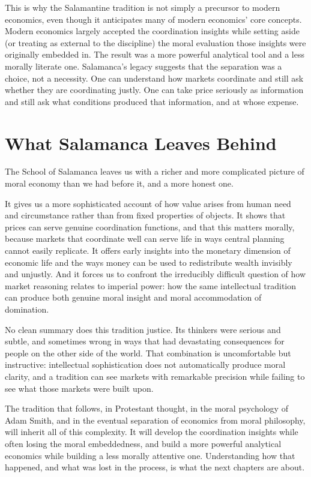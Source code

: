 \documentclass[11pt,a4paper,oneside]{book}
\begin{document}
This is why the Salamantine tradition is not simply a precursor to modern economics, even though it anticipates many of modern economics' core concepts. Modern economics largely accepted the coordination insights while setting aside (or treating as external to the discipline) the moral evaluation those insights were originally embedded in. The result was a more powerful analytical tool and a less morally literate one. Salamanca's legacy suggests that the separation was a choice, not a necessity. One can understand how markets coordinate and still ask whether they are coordinating justly. One can take price seriously as information and still ask what conditions produced that information, and at whose expense.

\section*{What Salamanca Leaves Behind}

The School of Salamanca leaves us with a richer and more complicated picture of moral economy than we had before it, and a more honest one.

It gives us a more sophisticated account of how value arises from human need and circumstance rather than from fixed properties of objects. It shows that prices can serve genuine coordination functions, and that this matters morally, because markets that coordinate well can serve life in ways central planning cannot easily replicate. It offers early insights into the monetary dimension of economic life and the ways money can be used to redistribute wealth invisibly and unjustly. And it forces us to confront the irreducibly difficult question of how market reasoning relates to imperial power: how the same intellectual tradition can produce both genuine moral insight and moral accommodation of domination.

No clean summary does this tradition justice. Its thinkers were serious and subtle, and sometimes wrong in ways that had devastating consequences for people on the other side of the world. That combination is uncomfortable but instructive: intellectual sophistication does not automatically produce moral clarity, and a tradition can see markets with remarkable precision while failing to see what those markets were built upon.

The tradition that follows, in Protestant thought, in the moral psychology of Adam Smith, and in the eventual separation of economics from moral philosophy, will inherit all of this complexity. It will develop the coordination insights while often losing the moral embeddedness, and build a more powerful analytical economics while building a less morally attentive one. Understanding how that happened, and what was lost in the process, is what the next chapters are about.
\end{document}
